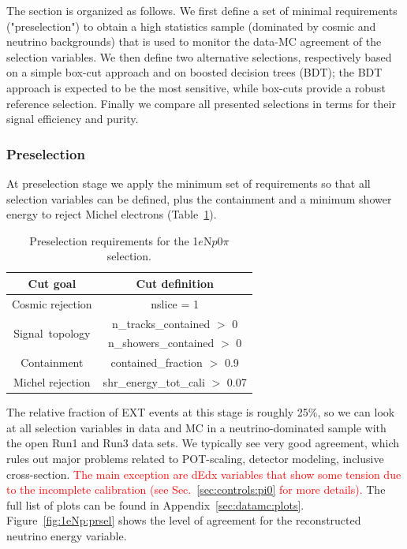 \documentclass[a4paper]{article}
\newcommand{\npsel}{1$e$N$p$0$\pi$ }
\begin{document}
The section is organized as follows. We first define a set of minimal requirements ("preselection") to obtain a high statistics sample (dominated by cosmic and neutrino backgrounds) that is used to monitor the data-MC agreement of the selection variables. We then define two alternative selections, respectively based on a simple box-cut approach and on boosted decision trees (BDT); the BDT approach is expected to be the most sensitive, while box-cuts provide a robust reference selection. Finally we compare all presented selections in terms for their signal efficiency and purity.

\subsubsection{Preselection}

At preselection stage we apply the minimum set of requirements so that all selection variables can be defined, plus the containment and a minimum shower energy to reject Michel electrons (Table~\ref{tab:1eNp:presel}).

\begin{table}[h!]
\centering
\setlength{\tabcolsep}{10pt}
\renewcommand{\arraystretch}{1.25}
 \begin{tabular}{| c | c |} 
 \hline
 Cut goal & Cut definition \\
 \hline\hline
Cosmic rejection & nslice = 1 \\
 \hline
\multirow{2}{*}{Signal~topology} & n\_tracks\_contained $>$ 0 \\
 & n\_showers\_contained $>$ 0 \\
 \hline
Containment & contained\_fraction $>$ 0.9 \\
 \hline
Michel rejection & shr\_energy\_tot\_cali $>$ 0.07 \\
 \hline
 \end{tabular}
 \caption{\label{tab:1eNp:presel} Preselection requirements for the \npsel selection.}
\end{table}

The relative fraction of EXT events at this stage is roughly 25\%, so we can look at all selection variables in data and MC in a neutrino-dominated sample with the open Run1 and Run3 data sets. We typically see very good agreement, which rules out major problems related to POT-scaling, detector modeling, inclusive cross-section. \textcolor{red}{The main exception are dEdx variables that show some tension due to the incomplete calibration (see Sec.~\ref{sec:controls:pi0} for more details).} The full list of plots can be found in Appendix~\ref{sec:datamc:plots}. Figure~\ref{fig:1eNp:prsel} shows the level of agreement for the reconstructed neutrino energy variable. 
\end{document}
